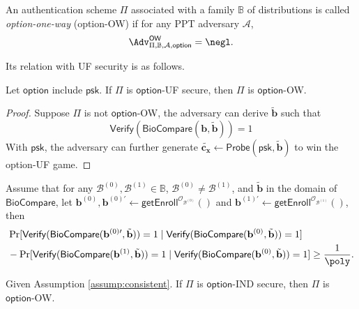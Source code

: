 An authentication scheme $\Pi$ associated with a family $\mathbb{B}$ of distributions is called \emph{\textsf{option}-one-way} (\textsf{option}-OW) if for any PPT adversary $\mathcal{A}$,
\[
	\Adv^{\textsf{OW}}_{\Pi, \mathbb{B}, \mathcal{A}, \textsf{option}} = \negl.
\]

Its relation with UF security is as follows.

\begin{theorem}
	Let $\textsf{option}$ include $\textsf{psk}$. If $\Pi$ is $\textsf{option}$-UF secure, then $\Pi$ is $\textsf{option}$-OW.
\end{theorem}

\begin{proof}
	Suppose $\Pi$ is not $\textsf{option}$-OW, the adversary can derive $\tilde{\mathbf{b}}$ such that 
	\[
		\textsf{Verify}(\textsf{BioCompare}(\mathbf{b}, \tilde{\mathbf{b}})) = 1
	\]
	With $\textsf{psk}$, the adversary can further generate $\tilde{\mathbf{c_x}} \gets \textsf{Probe}(\textsf{psk}, \tilde{\mathbf{b}})$ to win the \textsf{option-UF} game.
\end{proof}

\begin{assumption}
\label{assump:consistent}
	Assume that for any $\mathcal{B}^{(0)}, \mathcal{B}^{(1)} \in \mathbb{B}$, $\mathcal{B}^{(0)} \neq \mathcal{B}^{(1)}$, and $\tilde{\mathbf{b}}$ in the domain of $\mathsf{BioCompare}$, let $\mathbf{b}^{(0)}, \mathbf{b}^{(0) \prime} \gets \mathsf{getEnroll}^{\mathcal{O}_{\mathcal{B}^{(0)}}}()$ and $\mathbf{b}^{(1) \prime} \gets \mathsf{getEnroll}^{\mathcal{O}_{\mathcal{B}^{(1)}}}()$, then
	\begin{align*}
		& \Pr[\mathsf{Verify}(\mathsf{BioCompare}(\mathbf{b}^{(0)\prime}, \tilde{\mathbf{b}})) = 1 \mid \mathsf{Verify}(\mathsf{BioCompare}(\mathbf{b}^{(0)}, \tilde{\mathbf{b}})) = 1] \\
		& - \Pr[\mathsf{Verify}(\mathsf{BioCompare}(\mathbf{b}^{(1)}, \tilde{\mathbf{b}})) = 1 \mid \mathsf{Verify}(\mathsf{BioCompare}(\mathbf{b}^{(0)}, \tilde{\mathbf{b}})) = 1] \geq \frac{1}{\poly}.
	\end{align*}
\end{assumption}

\begin{theorem}
	Given Assumption \ref{assump:consistent}. If $\Pi$ is $\textsf{option}$-IND secure, then $\Pi$ is $\textsf{option}$-OW.
\end{theorem}

